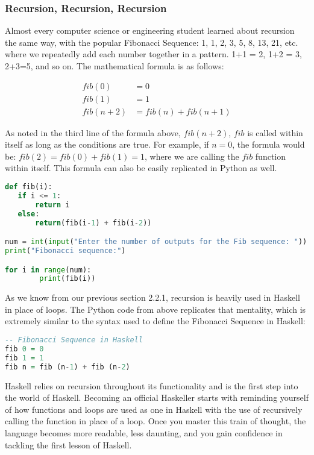 \documentclass{article}
\begin{document}
\subsubsection{Recursion, Recursion, Recursion}
Almost every computer science or engineering student learned about recursion the same way, with the popular Fibonacci Sequence: 1, 1, 2, 3, 5, 8, 13, 21, etc. where we repeatedly add each number together in a pattern. 1+1 = 2, 1+2 = 3, 2+3=5, and so on. The mathematical formula is as follows:

\begin{align}
fib(0) & = 0\\
fib(1) & = 1\\
fib(n+2) & = fib(n) + fib(n+1)
\end{align}

\noindent
As noted in the third line of the formula above, $fib(n+2)$, $fib$ is called within itself as long as the conditions are true. For example, if $n = 0$, the formula would be: $fib(2) = fib(0) + fib(1) = 1$, where we are calling the $fib$ function within itself.
This formula can also be easily replicated in Python as well.

\begin{lstlisting}[language=Python]
def fib(i):
   if i <= 1:
       return i
   else:
       return(fib(i-1) + fib(i-2))

num = int(input("Enter the number of outputs for the Fib sequence: "))
print("Fibonacci sequence:")

for i in range(num):
        print(fib(i))
\end{lstlisting}
\noindent
As we know from our previous section 2.2.1, recursion is heavily used in Haskell in place of loops. The Python code from above replicates that mentality, which is extremely similar to the syntax used to define the Fibonacci Sequence in Haskell:

\begin{lstlisting}[language=haskell]
-- Fibonacci Sequence in Haskell
fib 0 = 0
fib 1 = 1
fib n = fib (n-1) + fib (n-2)
\end{lstlisting}
\noindent
Haskell relies on recursion throughout its functionality and is the first step into the world of Haskell. Becoming an official Haskeller starts with reminding yourself of how functions and loops are used as one in Haskell with the use of recursively calling the function in place of a loop. Once you master this train of thought, the language becomes more readable, less daunting, and you gain confidence in tackling the first lesson of Haskell.
\end{document}
